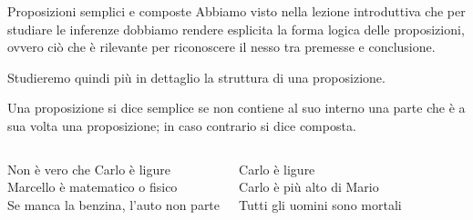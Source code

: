 \documentclass[aspectratio=169,10pt,dvipsnames,handout]{beamer}
\begin{document}
\begin{frame}{Proposizioni semplici e composte}
    Abbiamo visto nella lezione introduttiva che per studiare le inferenze dobbiamo rendere esplicita la \alert{forma logica} delle proposizioni, ovvero ciò che è rilevante per riconoscere il nesso tra premesse e conclusione.

    \medskip Studieremo quindi più in dettaglio la struttura di una proposizione.

    \pause
    \begin{definition}
        Una proposizione si dice \alert{semplice} se non contiene al suo interno una parte che è a sua volta una proposizione; in caso contrario si dice \alert{composta}.
    \end{definition}

    \vspace*{-0.5cm}
    \begin{columns}[t]
        \begin{example}
            \propshape
            Non è vero che {\only<3->{\color{blue}}Carlo è ligure}\\
            {Marcello è matematico} o fisico\\
            Se {\only<5->{\color{blue}}manca la benzina}, {l'auto non parte}
        \end{example}
        \begin{example}
            \propshape
            Carlo è ligure\\
            Carlo è più alto di Mario\\
            Tutti gli uomini sono mortali
        \end{example}
    \end{columns}
\end{frame}
\end{document}

